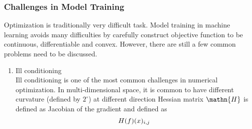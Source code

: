\subsubsection{Challenges in Model Training}

Optimization is traditionally very difficult task. Model training in machine learning avoids many difficulties by carefully construct objective function to be continuous, differentiable and convex. However, there are still a few common problems need to be discussed. 

\begin{enumerate}
    \item Ill conditioning\\
Ill conditioning is one of the most common challenges in numerical optimization. In multi-dimensional space, it is common to have different curvature (defined by $2^\circ$) at different direction
Hessian matrix $\mathn{H}$ is defined as Jacobian of the gradient and defined as 
\begin{equation}
    \mathnormal{H}(f)(x)_{i,j}
\end{equation}
\end{enumerate}

